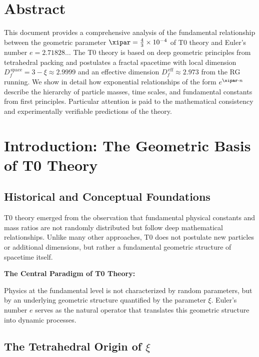 \section*{Abstract}
		This document provides a comprehensive analysis of the fundamental relationship between the geometric parameter $\xipar = \frac{4}{3} \times 10^{-4}$ of T0 theory and Euler's number $e = 2.71828\ldots$ The T0 theory is based on deep geometric principles from tetrahedral packing and postulates a fractal spacetime with local dimension $D_f^{\,\text{space}} = 3 - \xi \approx 2.9999$ and an effective dimension $D_f^{\,\text{eff}} \approx 2.973$ from the RG running. We show in detail how exponential relationships of the form $e^{\xipar \cdot n}$ describe the hierarchy of particle masses, time scales, and fundamental constants from first principles. Particular attention is paid to the mathematical consistency and experimentally verifiable predictions of the theory.

	
	
	\section{Introduction: The Geometric Basis of T0 Theory}
	
	\subsection{Historical and Conceptual Foundations}
	
	T0 theory emerged from the observation that fundamental physical constants and mass ratios are not randomly distributed but follow deep mathematical relationships. Unlike many other approaches, T0 does not postulate new particles or additional dimensions, but rather a fundamental geometric structure of spacetime itself.
	
	\begin{insight}
		\textbf{The Central Paradigm of T0 Theory:}
		
		Physics at the fundamental level is not characterized by random parameters, but by an underlying geometric structure quantified by the parameter $\xi$. Euler's number $e$ serves as the natural operator that translates this geometric structure into dynamic processes.
	\end{insight}
	
	\subsection{The Tetrahedral Origin of $\xi$}
	
